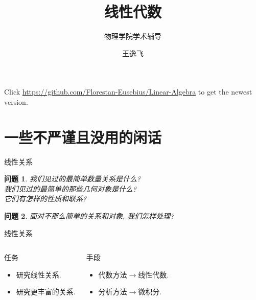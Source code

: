 \documentclass[11pt]{beamer}
\newtheorem{prob}{问题}[section]
\begin{document}
	\author{王逸飞}
	\title{线性代数}
	\subtitle{物理学院学术辅导}
\begin{frame}[plain]
	\titlepage
	\scriptsize Click  {\color{red}\url{https://github.com/Florestan-Eusebius/Linear-Algebra}} to get the newest version.
\end{frame}

\frame{\tableofcontents}

\section{一些不严谨且没用的闲话}
\frame{\sectionpage}

\begin{frame}{线性关系}
	\begin{prob}
		我们见过的最简单数量关系是什么?\\
		我们见过的最简单的那些几何对象是什么?\\
		它们有怎样的性质和联系?
	\end{prob}
	\begin{prob}
		面对不那么简单的关系和对象, 我们怎样处理?\\
	\end{prob}
\end{frame}

\begin{frame}{线性关系}
	\begin{columns}
		\begin{block}{任务}
			\begin{itemize}
				\item 研究线性关系.
				\item 研究更丰富的关系.
			\end{itemize}
		\end{block}
		\begin{block}{手段}
			\begin{itemize}
				\item 代数方法$\rightarrow$线性代数.
				\item 分析方法$\rightarrow$微积分.
			\end{itemize}
		\end{block}
	\end{columns}
\end{frame}
\end{document}
